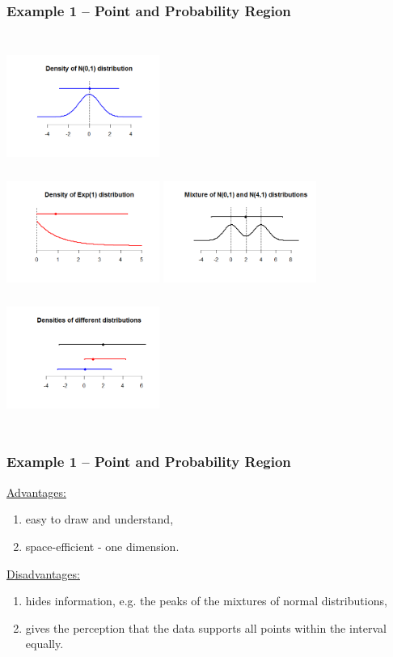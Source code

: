 \documentclass[11pt,usenames,dvipsnames,svgnames,x11names]{beamer}
\theoremstyle{plain}
\theoremstyle{definition}
\theoremstyle{remark}
\begin{document}
\begin{frame}
	\frametitle{Example 1 -- Point and Probability Region}
	\begin{columns}[t]
			\centering
			\includegraphics[width=5cm,height=4cm]{11.png}\\
			\includegraphics[width=5cm,height=4cm]{22.png}
		\centering
		\includegraphics[width=5cm,height=4cm]{33.png}\\
		\includegraphics[width=5cm,height=4cm]{44.png}
	\end{columns}
\end{frame}

\begin{frame}
	\frametitle{Example 1 -- Point and Probability Region}
	\underline{Advantages:}	
	\begin{enumerate}
		\item easy to draw and understand,
		\item space-efficient - one dimension.
	\end{enumerate}
	\bigskip
	\underline{Disadvantages:}
	\begin{enumerate}
		\item hides information, e.g. the peaks of the mixtures of normal distributions,
		\item gives the perception that the data supports all points within the interval equally.
	\end{enumerate}
\end{frame}
\end{document}
